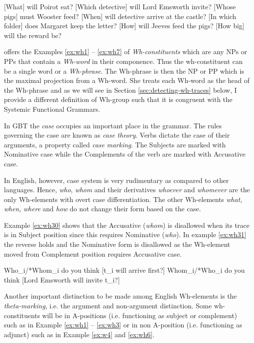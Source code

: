 \begin{exe}
	\ex\label{ex:wh1} [What] will Poirot eat?
	\ex\label{ex:wh2} [Which detective] will Lord Emsworth invite?
	\ex\label{ex:wh3} [Whose pigs] must Wooster feed?
	\ex\label{ex:wh4} [When] will detective arrive at the castle?
	\ex\label{ex:wh5} [In which folder] does Margaret keep the letter?
	\ex\label{ex:wh6} [How] will Jeeves feed the pigs? 
	\ex\label{ex:wh7} [How big] will the reward be?
\end{exe}

\citet[375]{Haegeman1991} offers the Examples \ref{ex:wh1} -- \ref{ex:wh7} of \textit{Wh-constituents} which are any NPs or PPs that contain a \textit{Wh-word} in their componence. Thus the wh-constituent can be a single word or a \textit{Wh-phrase}. The Wh-phrase is then the NP or PP which is the maximal projection from a Wh-word. She treats each Wh-word as the head of the Wh-phrase and as we will see in Section \ref{sec:detecting-wh-traces} below, I provide a different definition of Wh-group such that it is congruent with the Systemic Functional Grammars.

In GBT the \textit{case} occupies an important place in the grammar. The rules governing the case are known as \textit{case theory}. Verbs dictate the case of their arguments, a property called \textit{case marking}. The Subjects are marked with Nominative case while the Complements of the verb are marked with Accusative case. 

In English, however, case system is very rudimentary as compared to other languages. Hence, \textit{who}, \textit{whom} and their derivatives \textit{whoever} and \textit{whomever} are the only Wh-elements with overt case differentiation. The other Wh-elements \textit{what, when, where} and \textit{how} do not change their form based on the case. 

Example \ref{ex:wh30} shows that the Accusative (\textit{whom}) is disallowed when its trace is in Subject position since this requires Nominative (\textit{who}). In example \ref{ex:wh31} the reverse holds and the Nominative form is disallowed as the Wh-element moved from Complement position requires Accusative case. 

\begin{exe}
	\ex\label{ex:wh30} Who_{i}/*Whom_{i} do you think [t_{i} will arrive first?]
	\ex\label{ex:wh31} Whom_{i}/*Who_{i} do you think [Lord Emsworth will invite t_{i}?]
\end{exe}

Another important distinction to be made among English Wh-elements is the \textit{theta-marking}, i.e. the argument and non-argument distinction. Some wh-constituents will be in A-positions (i.e. functioning as subject or complement) such as in Example \ref{ex:wh1} -- \ref{ex:wh3} or in non A-position (i.e. functioning as adjunct) such as in Example \ref{ex:w4} and \ref{ex:wh6}. 

